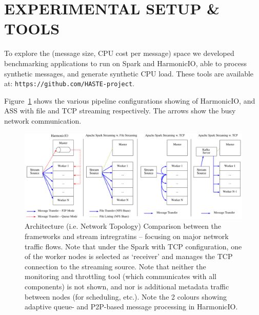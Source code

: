 \documentclass[conference]{IEEEtran}
\begin{document}

\section{EXPERIMENTAL SETUP \& TOOLS}\label{expsetup}

To explore the (message size, CPU cost per message) space we developed benchmarking applications to run on Spark and HarmonicIO, able to process synthetic messages, and generate synthetic CPU load. These tools are available at: \texttt{https://github.com/HASTE-project}.

Figure~\ref{fig:arch-comp} shows the various pipeline configurations showing of HarmonicIO, and ASS with file and TCP streaming respectively. The arrows show the busy network communication.

\begin{figure}[h]
\includegraphics[width=\textwidth]{images/arch-comp-w-kafka}
\caption{Architecture (i.e. Network Topology) Comparison between the frameworks and stream intregratins -- focusing on major network traffic flows. Note that under the Spark with TCP configuration, one of the worker nodes is selected as `receiver' and manages the TCP connection to the streaming source. 
Note that neither the monitoring and throttling tool (which communicates with all components) is not shown, and nor is additional metadata traffic between nodes (for scheduling, etc.). Note the 2 colours showing adaptive queue- and P2P-based message processing in HarmonicIO.}
\label{fig:arch-comp}
\end{figure}
\end{document}
